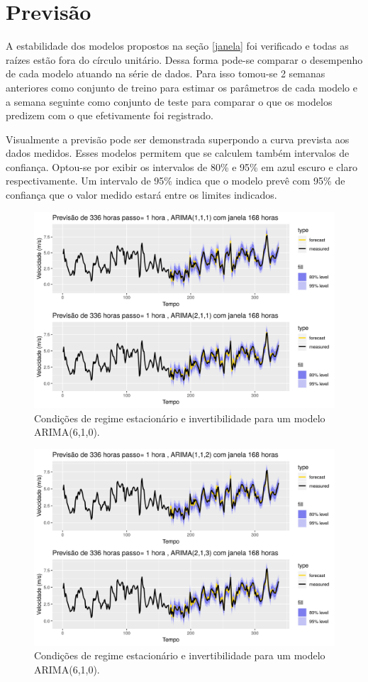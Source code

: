\documentclass[
	12pt,				%
	openright,			%
	oneside,			%
	a4paper,			%
	english,			%
	french,				%
	spanish,			%
	brazil				%
	]{abntex2}
\begin{document}
\section{Previsão}

A estabilidade dos modelos propostos na seção \ref{janela} foi verificado e todas as raízes estão fora do círculo unitário. Dessa forma pode-se comparar o desempenho de cada modelo atuando na série de dados. Para isso tomou-se 2 semanas anteriores como conjunto de treino para estimar os parâmetros de cada modelo e a semana seguinte como conjunto de teste para comparar o que os modelos predizem com o que efetivamente foi registrado.

Visualmente a previsão pode ser demonstrada superpondo a curva prevista aos dados medidos. Esses modelos permitem que se calculem também intervalos de confiança. Optou-se por exibir os intervalos de 80\% e 95\% em azul escuro e claro respectivamente. Um intervalo de 95\% indica que o modelo prevê com 95\% de confiança que o valor medido estará entre os limites indicados.

\begin{figure}[h]
    \centering
	\includegraphics[width=\textwidth]{arima12}
	\caption{Condições de regime estacionário e invertibilidade para um modelo ARIMA(6,1,0).}
\end{figure}
\FloatBarrier

\begin{figure}[h]
    \centering
	\includegraphics[width=\textwidth]{arima34}
	\caption{Condições de regime estacionário e invertibilidade para um modelo ARIMA(6,1,0).}
\end{figure}
\FloatBarrier
\end{document}

